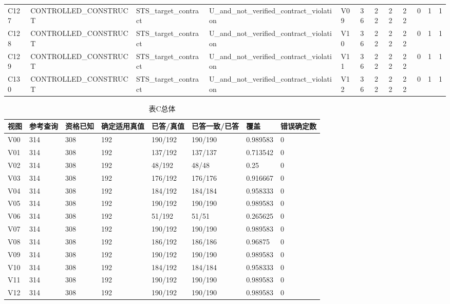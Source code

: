 \begin{longtable}{llllllllllll}
C127 & CONTROLLED\_CONSTRUCT & STS\_target\_contract & U\_and\_not\_verified\_contract\_violation & V09 & 36 & 22 & 22 & 22 & 0 & 1 & 1 \\
C128 & CONTROLLED\_CONSTRUCT & STS\_target\_contract & U\_and\_not\_verified\_contract\_violation & V10 & 36 & 22 & 22 & 22 & 0 & 1 & 1 \\
C129 & CONTROLLED\_CONSTRUCT & STS\_target\_contract & U\_and\_not\_verified\_contract\_violation & V11 & 36 & 22 & 22 & 22 & 0 & 1 & 1 \\
C130 & CONTROLLED\_CONSTRUCT & STS\_target\_contract & U\_and\_not\_verified\_contract\_violation & V12 & 36 & 22 & 22 & 22 & 0 & 1 & 1 \\
\hline\end{longtable}

\begin{longtable}{llllllll}
\caption{表C总体}\\
\hline
视图 & 参考查询 & 资格已知 & 确定适用真值 & 已答/真值 & 已答一致/已答 & 覆盖 & 错误确定数 \\
\hline\endhead
V00 & 314 & 308 & 192 & 190/192 & 190/190 & 0.989583 & 0 \\
V01 & 314 & 308 & 192 & 137/192 & 137/137 & 0.713542 & 0 \\
V02 & 314 & 308 & 192 & 48/192 & 48/48 & 0.25 & 0 \\
V03 & 314 & 308 & 192 & 176/192 & 176/176 & 0.916667 & 0 \\
V04 & 314 & 308 & 192 & 184/192 & 184/184 & 0.958333 & 0 \\
V05 & 314 & 308 & 192 & 190/192 & 190/190 & 0.989583 & 0 \\
V06 & 314 & 308 & 192 & 51/192 & 51/51 & 0.265625 & 0 \\
V07 & 314 & 308 & 192 & 190/192 & 190/190 & 0.989583 & 0 \\
V08 & 314 & 308 & 192 & 186/192 & 186/186 & 0.96875 & 0 \\
V09 & 314 & 308 & 192 & 190/192 & 190/190 & 0.989583 & 0 \\
V10 & 314 & 308 & 192 & 184/192 & 184/184 & 0.958333 & 0 \\
V11 & 314 & 308 & 192 & 190/192 & 190/190 & 0.989583 & 0 \\
V12 & 314 & 308 & 192 & 190/192 & 190/190 & 0.989583 & 0 \\
\hline\end{longtable}
